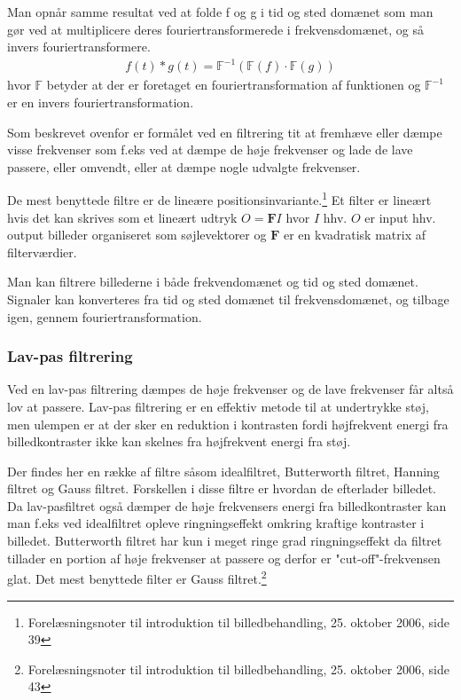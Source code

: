 Man opnår samme resultat ved at folde f og g i tid og sted domænet som man gør ved at multiplicere deres fouriertransformerede i frekvensdomænet, og så invers fouriertransformere.
\begin{align}
	f(t)*g(t) = \mathbb{F}^{-1}(\mathbb{F}(f)\cdot\mathbb{F}(g))
\end{align}
hvor $\mathbb{F}$ betyder at der er foretaget en fouriertransformation af funktionen og $\mathbb{F}^{-1}$ er en invers fouriertransformation.

Som beskrevet ovenfor er formålet ved en filtrering tit at fremhæve eller dæmpe visse frekvenser som f.eks ved at dæmpe de høje frekvenser og lade de lave passere, eller omvendt, eller at dæmpe nogle udvalgte frekvenser. 

De mest benyttede filtre er de lineære positionsinvariante.\footnote{Forelæsningsnoter til introduktion til billedbehandling, 25. oktober 2006, side 39} Et filter er lineært hvis det kan skrives som et lineært udtryk $O=\mathbf{F}I$ hvor $I$ hhv. $O$ er input hhv. output billeder organiseret som søjlevektorer og $\mathbf{F}$ er en kvadratisk matrix af filterværdier. 

Man kan filtrere billederne i både frekvendomænet og tid og sted domænet. Signaler kan konverteres fra tid og sted domænet til frekvensdomænet, og tilbage igen, gennem fouriertransformation.

\subsubsection{Lav-pas filtrering}
Ved en lav-pas filtrering dæmpes de høje frekvenser og de lave frekvenser får altså lov at passere. Lav-pas filtrering er en effektiv metode til at undertrykke støj, men ulempen er at der sker en reduktion i kontrasten fordi højfrekvent energi fra billedkontraster ikke kan skelnes fra højfrekvent energi fra støj.

Der findes her en række af filtre såsom idealfiltret, Butterworth filtret, Hanning filtret og Gauss filtret. Forskellen i disse filtre er hvordan de efterlader billedet. Da lav-pasfiltret også dæmper de høje frekvensers energi fra billedkontraster kan man f.eks ved idealfiltret opleve ringningseffekt omkring kraftige kontraster i billedet. Butterworth filtret har kun i meget ringe grad ringningseffekt da filtret tillader en portion af høje frekvenser at passere og derfor er "cut-off"-frekvensen glat. Det mest benyttede filter er Gauss filtret.\footnote{Forelæsningsnoter til introduktion til billedbehandling, 25. oktober 2006, side 43}

